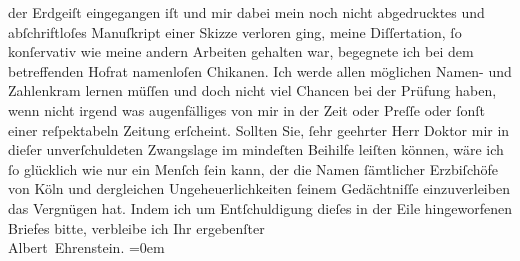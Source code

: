 \begin{ledgroupsized}[t]{13cm}
                  {\pb}der Erdgeiſt eingegangen iſt und mir dabei mein noch nicht abgedrucktes und
               abſchriftloſes Manuſkript einer Skizze verloren ging, meine Diſſertation, ſo konſervativ wie meine
               andern Arbeiten gehalten war, begegnete ich bei dem betreffenden Hofrat namenloſen Chikanen. Ich werde allen
               möglichen Namen- und Zahlenkram lernen müſſen und doch nicht viel Chancen bei der
               Prüfung haben, wenn nicht irgend was augenfälliges von mir in der Zeit oder Preſſe oder ſonſt
               einer reſpektabeln Zeitung erſcheint. Sollten Sie, {\pb}ſehr geehrter Herr Doktor mir in dieſer
               unverſchuldeten Zwangslage im mindeſten Beihilfe leiſten können, wäre ich ſo
               glücklich wie nur ein Menſch ſein kann, der die Namen ſämtlicher Erzbiſchöfe von Köln und dergleichen Ungeheuerlichkeiten ſeinem
               Gedächtniſſe einzuverleiben das Vergnügen hat.\pend
           \pstart
           Indem ich um Entſchuldigung dieſes in der Eile hingeworfenen Briefes bitte, verbleibe
               ich\pend
           \pstart
           Ihr ergebenſter{\\[\baselineskip]}\spacefill\mbox{Albert Ehrenstein.}\pend
           \leftskip=0em{}
         
         \endnumbering{}\end{ledgroupsized}  \newcommand{\dateiname}{L01852}\newcommand{\titel}{Albert Ehrenstein an Arthur Schnitzler, 1. 7. 1909}\newcommand{\editorInnen}{Martin Anton Müller und Gerd-Hermann Susen}
      